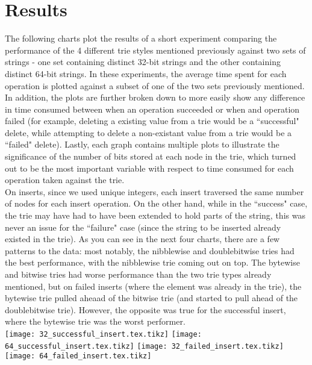 \documentclass{llncs}
\begin{document}
\section{Results}
The following charts plot the results of a short experiment comparing the performance of the 4 different trie styles mentioned previously against two sets of strings - one set containing distinct 32-bit strings and the other containing distinct 64-bit strings. In these experiments, the average time spent for each operation is plotted against a subset of one of the two sets previously mentioned. In addition, the plots are further broken down to more easily show any difference in time consumed between when an operation succeeded or when and operation failed (for example, deleting a existing value from a trie would be a ``successful" delete, while attempting to delete a non-existant value from a trie would be a ``failed" delete). Lastly, each graph contains multiple plots to illustrate the significance of the number of bits stored at each node in the trie, which turned out to be the most important variable with respect to time consumed for each operation taken against the trie. \\
\newpage
On inserts, since we used unique integers, each insert traversed the same number of nodes for each insert operation. On the other hand, while in the ``success" case, the trie may have had to have been extended to hold parts of the string, this was never an issue for the ``failure" case (since the string to be inserted already existed in the trie). As you can see in the next four charts, there are a few patterns to the data: most notably, the nibblewise and doublebitwise tries had the best performance, with the nibblewise trie coming out on top. The bytewise and bitwise tries had worse performance than the two trie types already mentioned, but on failed inserts (where the element was already in the trie), the bytewise trie pulled aheaad of the bitwise trie (and started to pull ahead of the doublebitwise trie). However, the opposite was true for the successful insert, where the bytewise trie was the worst performer.\\
\texttt{[image: 32\_successful\_insert.tex.tikz]}
\texttt{[image: 64\_successful\_insert.tex.tikz]}
\texttt{[image: 32\_failed\_insert.tex.tikz]}
\texttt{[image: 64\_failed\_insert.tex.tikz]}
\end{document}
